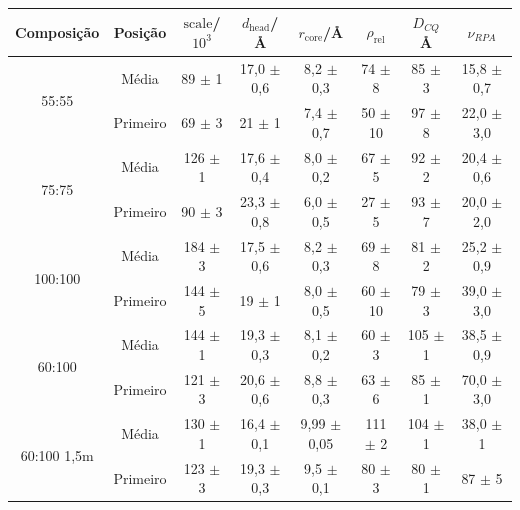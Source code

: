 	
	\begin{table}[h]
		{%
			\begin{tabular}{c c | c c c c c c}
				\toprule
				            Composição             & Posição  & \(\mathrm{scale}\)/\(10^3\) & \(d_{\mathrm{head}}\)/\AA    & \(r_{\mathrm{core}}\)/\AA       & \(\rho_{\mathrm{rel}}\)   & \(D_{CQ}\)\AA & \(\nu_{RPA}\)      \\ \midrule
				   \multirow{2}{*}{55:55}    & Média    & 89  \(\pm\) 1   & 17,0   \(\pm\) 0,6 & 8,2      \(\pm\) 0,3  & 74   \(\pm\)  8  & 85 \(\pm\) 3  & 15,8   \(\pm\) 0,7 \\
				                             & Primeiro & 69  \(\pm\) 3   & 21   \(\pm\) 1     & 7,4      \(\pm\) 0,7  & 50    \(\pm\) 10 & 97 \(\pm\) 8  & 22,0   \(\pm\) 3,0 \\
				   \multirow{2}{*}{75:75}    & Média    & 126  \(\pm\) 1  & 17,6   \(\pm\) 0,4 & 8,0      \(\pm\) 0,2  & 67   \(\pm\)  5  & 92 \(\pm\) 2  & 20,4   \(\pm\) 0,6 \\
				                             & Primeiro & 90  \(\pm\) 3   & 23,3   \(\pm\) 0,8 & 6,0      \(\pm\) 0,5  & 27   \(\pm\)  5  & 93 \(\pm\) 7  & 20,0   \(\pm\) 2,0 \\
				  \multirow{2}{*}{100:100}   & Média    & 184  \(\pm\) 3  & 17,5   \(\pm\) 0,6 & 8,2      \(\pm\) 0,3  & 69   \(\pm\)  8  & 81 \(\pm\) 2  & 25,2   \(\pm\) 0,9 \\
				                             & Primeiro & 144  \(\pm\) 5  & 19   \(\pm\) 1     & 8,0      \(\pm\) 0,5  & 60    \(\pm\) 10 & 79 \(\pm\) 3  & 39,0   \(\pm\) 3,0 \\
				  \multirow{2}{*}{60:100}    & Média    & 144  \(\pm\) 1  & 19,3   \(\pm\) 0,3 & 8,1      \(\pm\) 0,2  & 60    \(\pm\) 3  & 105 \(\pm\) 1 & 38,5   \(\pm\) 0,9 \\
				                             & Primeiro & 121  \(\pm\) 3  & 20,6   \(\pm\) 0,6 & 8,8      \(\pm\) 0,3  & 63   \(\pm\)  6  & 85 \(\pm\) 1  & 70,0   \(\pm\) 3,0 \\
				\multirow{2}{*}{60:100 1,5m} & Média    & 130  \(\pm\) 1  & 16,4   \(\pm\) 0,1 & 9,99     \(\pm\) 0,05 & 111   \(\pm\)  2 & 104 \(\pm\) 1 & 38,0   \(\pm\) 1   \\
				                             & Primeiro & 123  \(\pm\) 3  & 19,3   \(\pm\) 0,3 & 9,5      \(\pm\) 0,1  & 80    \(\pm\) 3  & 80 \(\pm\) 1  & 87   \(\pm\) 5     \\ \bottomrule
			\end{tabular}
		}{}
	\end{table} 

